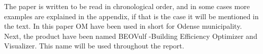 The paper is written to be read in chronological order, and in some cases more examples are explained in the appendix, if that is the case it will be mentioned in the text.
In this paper OM have been used in short for Odense municipality. Next, the product have been named BEOVulf  -Building Efficiency Optimizer and Visualizer. This name will be used throughout the report.